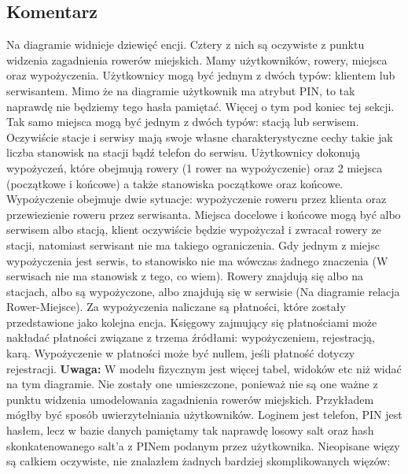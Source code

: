 \documentclass{article}
\begin{document}
\subsection{Komentarz}
Na diagramie widnieje dziewięć encji.
Cztery z nich są oczywiste z punktu widzenia zagadnienia rowerów miejskich.
Mamy użytkowników, rowery, miejsca oraz wypożyczenia.
Użytkownicy mogą być jednym z dwóch typów: klientem lub serwisantem. Mimo że na diagramie użytkownik
ma atrybut PIN, to tak naprawdę nie będziemy tego hasła pamiętać. Więcej o tym pod koniec tej sekcji.
Tak samo miejsca mogą być jednym z dwóch typów: stacją lub serwisem.
Oczywiście stacje i serwisy mają swoje własne charakterystyczne cechy takie jak liczba stanowisk
na stacji bądź telefon do serwisu.
\newline
\newline
Użytkownicy dokonują wypożyczeń, które obejmują rowery (1 rower na wypożyczenie)
oraz 2 miejsca (początkowe i końcowe) a także stanowiska początkowe oraz końcowe.
Wypożyczenie obejmuje dwie sytuacje: wypożyczenie roweru przez klienta oraz przewiezienie roweru przez serwisanta.
Miejsca docelowe i końcowe mogą być albo serwisem albo stacją,
klient oczywiście będzie wypożyczał i zwracał rowery ze stacji, natomiast serwisant nie ma takiego ograniczenia.
Gdy jednym z miejsc wypożyczenia jest serwis,
to stanowisko nie ma wówczas żadnego znaczenia (W serwisach nie ma stanowisk z tego, co wiem).
\newline
\newline
Rowery znajdują się albo na stacjach, albo są wypożyczone, albo znajdują się w serwisie
(Na diagramie relacja Rower-Miejsce).
Za wypożyczenia naliczane są płatności, które zostały przedstawione jako kolejna encja.
Księgowy zajmujący się płatnościami może nakładać płatności
związane z trzema źródłami: wypożyczeniem, rejestracją, karą.
Wypożyczenie w płatności może być nullem, jeśli płatność dotyczy rejestracji.
\newline
\newline
\textbf{Uwaga:} W modelu fizycznym jest więcej tabel, widoków etc niż widać na tym diagramie.
Nie zostały one umieszczone, ponieważ nie są one ważne z punktu widzenia umodelowania zagadnienia rowerów miejskich.
Przykładem mógłby być sposób uwierzytelniania użytkowników. Loginem jest telefon, PIN jest hasłem, lecz w bazie danych
pamiętamy tak naprawdę losowy salt oraz hash skonkatenowanego salt'a z PINem podanym przez użytkownika.
\newline
\newline
Nieopisane więzy są całkiem oczywiste, nie znalazłem żadnych bardziej skomplikowanych więzów:
\end{document}
